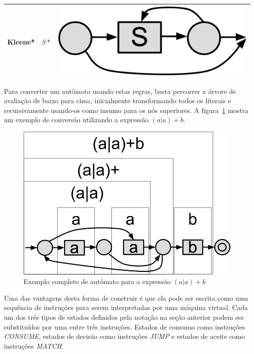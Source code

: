 \documentclass[a4paper,12pt,oneside,onecolumn]{uerj}
\begin{document}
\begin{center}
\begin{tabular}{ c | c | c }
		\hline
		Kleene* & $S*$ & \includegraphics[scale=0.25]{figures/thompson_kleene.png} \\ 
		\hline
	\end{tabular}
\end{center}

Para converter um autômato usando estas regras, basta percorrer a árvore de avaliação de baixo para cima, inicialmente transformando todos os literais e recursivamente usando-os como insumo para os nós superiores. A figura~\ref{fig:exemplo_automato_completo} mostra um exemplo de conversão utilizando a expressão $(a|a)+b$.

\begin{figure}[!htbp]
  \centering
  \includegraphics[scale=0.33]{figures/exemplo_automato_completo.png}
  \caption{Exemplo completo de autômato para a expressão $(a|a)+b$}
  \label{fig:exemplo_automato_completo}
\end{figure}

Uma das vantagens desta forma de construir é que ela pode ser escrita como uma sequência de instruções para serem interpretadas por uma máquina virtual. Cada um dos três tipos de estados definidos pela notação na seção anterior podem ser substituídos por uma entre três instruções. Estados de consumo como instruções \emph{CONSUME}, estados de decisão como instruções \emph{JUMP} e estados de aceite como instruções \emph{MATCH}.
\end{document}
